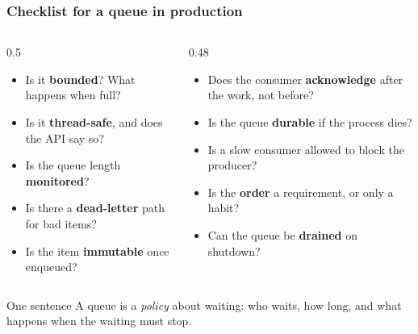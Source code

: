 \documentclass[aspectratio=169,10pt,compress]{beamer}
\begin{document}




\begin{frame}[t,fragile] \frametitle{Checklist for a queue in production}
  \begin{columns}[T]
    \begin{column}{0.5\textwidth}
      \begin{itemize}\small
        \item Is it \textbf{bounded}? What happens when full?
        \item Is it \textbf{thread-safe}, and does the API say so?
        \item Is the queue length \textbf{monitored}?
        \item Is there a \textbf{dead-letter} path for bad items?
        \item Is the item \textbf{immutable} once enqueued?
      \end{itemize}
    \end{column}
    \begin{column}{0.48\textwidth}
      \begin{itemize}\small
        \item Does the consumer \textbf{acknowledge} after the work, not before?
        \item Is the queue \textbf{durable} if the process dies?
        \item Is a slow consumer allowed to block the producer?
        \item Is the \textbf{order} a requirement, or only a habit?
        \item Can the queue be \textbf{drained} on shutdown?
      \end{itemize}
    \end{column}
  \end{columns}
  \vspace{0.4em}
  \begin{block}{One sentence}
    \small A queue is a \emph{policy} about waiting: who waits, how long, and what happens when the waiting must stop.
  \end{block}
\end{frame}
\end{document}
